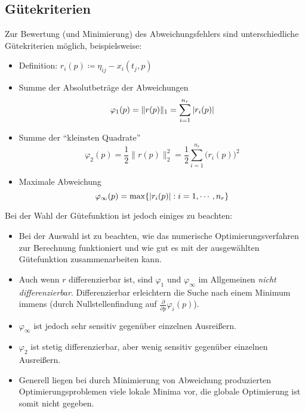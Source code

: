         \subsection{Gütekriterien} %
            Zur Bewertung (und Minimierung) des Abweichungsfehlers sind unterschiedliche Gütekriterien möglich, beispielsweise:
            \begin{itemize}
                \item Definition: \( r_i(p) \coloneqq \eta _ {ij} - x _ i (t _ j, p) \)
            	\item Summe der Absolutbeträge der Abweichungen
                	\begin{equation*}
	                	\varphi _ 1 (p) = \lVert r(p) \rVert _ 1 = \sum_{i = 1}^{n _ r} \abs{r_i(p)}
                	\end{equation*}
                \item Summe der \enquote{kleinsten Quadrate}
	                \begin{equation*}
		                \varphi _ 2 (p) = \frac{1}{2} \lVert r(p) \rVert _ 2 ^ 2 = \frac{1}{2} \sum_{i = 1}^{n _ r} \big( r _ i (p) \big) ^ 2
	                \end{equation*}
	            \item Maximale Abweichung
		            \begin{equation*}
			            \varphi _ \infty (p) = \max \{ \abs{r _ i (p)} : i = 1, \cdots, n _ r \}
		            \end{equation*}
            \end{itemize}
            
            Bei der Wahl der Gütefunktion ist jedoch einiges zu beachten:
            \begin{itemize}
            	\item Bei der Auswahl ist zu beachten, wie das numerische Optimierungsverfahren zur Berechnung funktioniert und wie gut es mit der ausgewählten Gütefunktion zusammenarbeiten kann.
            	\item Auch wenn \(r\) differenzierbar ist, sind \( \varphi_1 \) und \( \varphi_\infty \) im Allgemeinen \textit{nicht differenzierbar}. Differenzierbar erleichtern die Suche nach einem Minimum immens (durch Nullstellenfindung auf \( \frac{\partial}{\partial p} \varphi _ i (p) \)).
            	\item \( \varphi _ \infty \) ist jedoch sehr sensitiv gegenüber einzelnen Ausreißern.
            	\item \( \varphi _ 2 \) ist stetig differenzierbar, aber wenig sensitiv gegenüber einzelnen Ausreißern.
            	\item Generell liegen bei durch Minimierung von Abweichung produzierten Optimierungsproblemen viele lokale Minima vor, die globale Optimierung ist somit nicht gegeben.
            \end{itemize}

